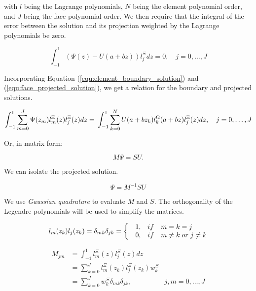 \noindent
with \(l\) being the Lagrange polynomials, \(N\) being the element polynomial order, and \(J\) being
the face polynomial order. We then require that the integral of the error between the solution and
its projection weighted by the Lagrange polynomials be zero. 

\begin{equation} \label{equ:zero_error}
    \int_{-1}^{1} \left( \Psi (z) - U(a + bz) \right) l_j^\Xi dz = 0, \quad j = 0, \ldots,J
\end{equation}

Incorporating Equation (\ref{equ:element_boundary_solution}) and (\ref{equ:face_projected_solution}),
we get a relation for the boundary and projected solutions.

\begin{equation} \label{equ:boundarry_and_projected}
    \int_{-1}^{1} \sum_{m = 0}^{J} \Psi (z_m) l_m^\Xi (z) l_j ^ \Xi(z) dz = \\
    \int_{-1}^{1} \sum_{k = 0}^{N} U(a + b z_k) l_k^\Omega (a + b z) l_j ^ \Xi (z) dz, \\ \quad
    j = 0, \ldots, J
\end{equation}

Or, in matrix form:

\begin{equation}
    M \Psi = S U.
\end{equation}

We can isolate the projected solution.

\begin{equation}
    \Psi = M^{-1} S U
\end{equation}

We use \textit{Gaussian quadrature} to evaluate \(M\) and \(S\). The orthogonality of the Legendre
polynomials will be used to simplify the matrices.

\begin{equation} \label{equ:orthogonality_M}
    l_m (z_k) l_j (z_k) = \\
    \delta _{mk} \delta _{j k} = \left \{ \begin{matrix*}[l]
    & 1, & if & m = k = j \\ 
    & 0, & if & m \neq k \; or \; j \neq k
    \end{matrix*}\right.
\end{equation}

\begin{equation} \label{equ:matrix_M}
    \begin{aligned}
        M_{jm} &= \int_{-1}^{1} l_m ^ \Xi (z) l_j ^ \Xi (z) dz \\
        &= \sum_{k = 0}^{J} l_m ^ \Xi (z_k) l_j ^ \Xi (z_k)w_k ^ \Xi \\
        &= \sum_{k = 0}^{J} w_k ^ \Xi \delta_{mk}\delta_{jk}, & j, m = 0, \ldots, J
    \end{aligned}
\end{equation}

